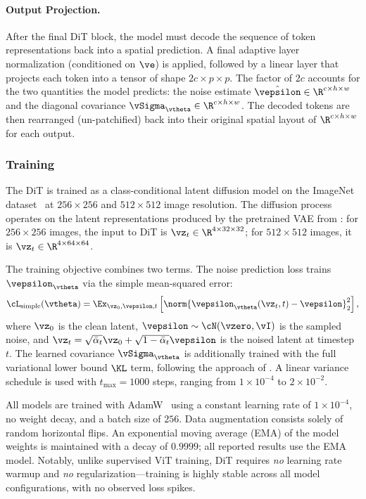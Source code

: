 \documentclass[../../book-main.tex]{subfiles}
\begin{document}
\paragraph{Output Projection.}
After the final DiT block, the model must decode the sequence of token representations back into a spatial prediction.
A final adaptive layer normalization (conditioned on \(\ve\)) is applied, followed by a linear layer that projects each token into a tensor of shape \(2c \times p \times p\).
The factor of \(2c\) accounts for the two quantities the model predicts: the noise estimate \(\hat{\vepsilon} \in \R^{c \times h \times w}\) and the diagonal covariance \(\vSigma_{\vtheta} \in \R^{c \times h \times w}\).
The decoded tokens are then rearranged (un-patchified) back into their original spatial layout of \(\R^{c \times h \times w}\) for each output.

\subsubsection{Training}
The DiT is trained as a class-conditional latent diffusion model on the ImageNet dataset~\citep{deng2009imagenet} at \(256 \times 256\) and \(512 \times 512\) image resolution.
The diffusion process operates on the latent representations produced by the pretrained VAE from : for \(256 \times 256\) images, the input to DiT is \(\vz_t \in \R^{4 \times 32 \times 32}\);
for \(512 \times 512\) images, it is \(\vz_t \in \R^{4 \times 64 \times 64}\).

The training objective combines two terms.
The noise prediction loss trains \(\vepsilon_{\vtheta}\) via the simple mean-squared error:
\begin{equation}
    \cL_{\text{simple}}(\vtheta) = \Ex_{\vz_0, \vepsilon, t}\left[\norm{\vepsilon_{\vtheta}(\vz_t, t) - \vepsilon}_2^2\right] ,
\end{equation}
where \(\vz_0\) is the clean latent, \(\vepsilon \sim \cN(\vzero, \vI)\) is the sampled noise, and \(\vz_t = \sqrt{\bar{\alpha}_t}\vz_0 + \sqrt{1 - \bar{\alpha}_t}\vepsilon\) is the noised latent at timestep \(t\).
The learned covariance \(\vSigma_{\vtheta}\) is additionally trained with the full variational lower bound \(\KL\) term, following the approach of \citet{nichol2021improved}.
A linear variance schedule is used with \(t_{\max} = 1000\) steps, ranging from \(1 \times 10^{-4}\) to \(2 \times 10^{-2}\).

All models are trained with AdamW~\citep{loshchilov2019decoupled} using a constant learning rate of \(1 \times 10^{-4}\), no weight decay, and a batch size of \(256\).
Data augmentation consists solely of random horizontal flips. An exponential moving average (EMA) of the model weights is maintained with a decay of \(0.9999\);
all reported results use the EMA model. Notably, unlike supervised ViT training, DiT requires \textit{no} learning rate warmup and \textit{no} regularization---training is highly stable across all model configurations, with no observed loss spikes.
\end{document}
